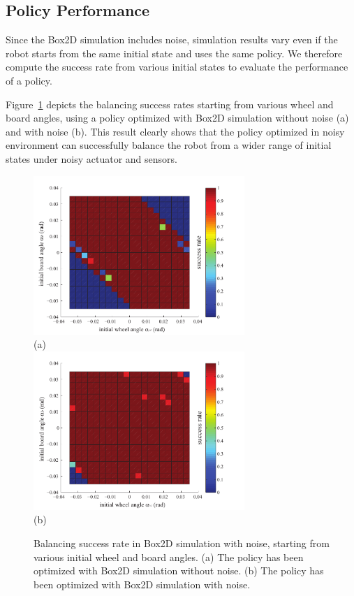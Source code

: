 \subsection{Policy Performance}

Since the Box2D simulation includes noise, simulation results vary 
even if the robot starts from the same initial state and uses the same
policy. 
We therefore compute the success rate from various initial states to
evaluate the performance of a policy.

Figure~\ref{fig:learning_success-rate} depicts the balancing success
rates starting from various wheel and board angles, using a policy
optimized with Box2D simulation without noise (a) and with noise (b).
This result clearly shows that the policy optimized in noisy environment
can successfully balance the robot from a wider range of initial states
under noisy actuator and sensors.

\begin{figure}[tb]
\begin{center}
\includegraphics[width=80mm]{eps/sim_clean2_0000128.pdf}\\
(a)\\
\includegraphics[width=80mm]{eps/sim_noise1_0000128.pdf}\\
(b)
\caption{Balancing success rate in Box2D simulation with noise, starting
 from various initial wheel and board angles.
(a) The policy has been optimized with Box2D simulation without noise.
(b) The policy has been optimized with Box2D simulation with noise.}
\label{fig:learning_success-rate}
\end{center}
\end{figure}


